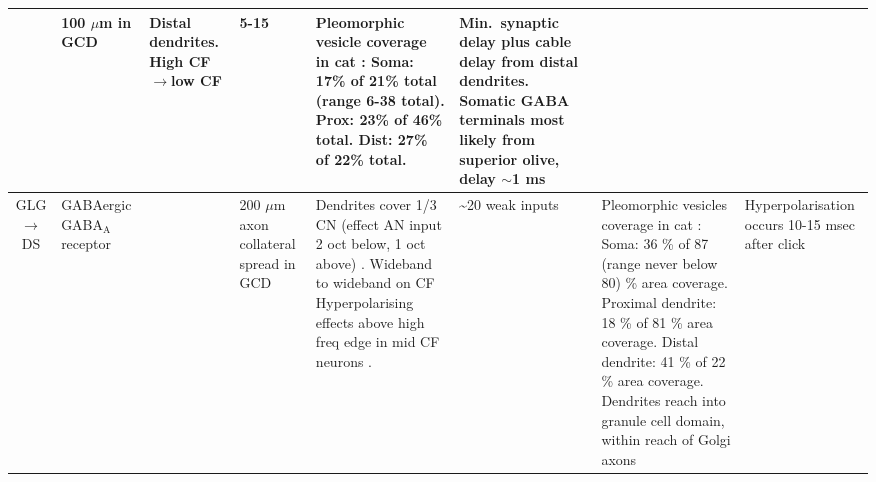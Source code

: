\begin{longtable}{cYYYYYYY}
& %
100 $\mu$m in GCD \citep{FerragamoGoldingEtAl:1998}
& %
Distal dendrites.
High CF\ensuremath{\rightarrow}low CF \citep[chinchilla][]{JosephsonMorest:1998}                        
& %
5-15 \citep[Estimate, cat][]{SmithRhode:1989}     
& %
Pleomorphic vesicle coverage in cat \citep{SmithRhode:1989}:
Soma: 17\% of 21\% total (range 6-38 total). 
Prox: 23\% of 46\% total. 
Dist: 27\% of 22\% total. 
& %
Min.\ synaptic delay plus cable delay from distal dendrites.
Somatic GABA terminals most likely from superior olive, delay $\sim$1 ms
\\ \midrule
GLG\ensuremath{\rightarrow}DS                         
& %
{GABAergic} {GABA$_{\textrm{A}}$} receptor \citep{EvansZhao:1998,FerragamoGoldingEtAl:1998a,Mugnaini:1985,MugnainiOsenEtAl:1980,SaintMorestEtAl:1989}                           
& %
& %
200 $\mu$m axon collateral spread in GCD \citep{FerragamoGoldingEtAl:1998}
& %
Dendrites cover 1/3 CN (effect AN input 2 oct below, 1 oct above) \citep[guinea pig][]{PalmerJiangEtAl:1996}.
Wideband to wideband on CF \citep{EvansZhao:1998} 
Hyperpolarising effects above high freq edge in mid CF neurons \citep[rat][]{PaoliniClark:1999}.                    
& %
\~{}20 weak inputs\citep{SaintMorestEtAl:1989}                     
& %
Pleomorphic vesicles coverage in cat \citep{SmithRhode:1989}:
Soma: 36 \%  of 87 (range never below 80) \% area coverage. 
Proximal dendrite: 18 \%  of 81 \% area coverage.  
Distal dendrite: 41 \%  of 22 \% area coverage.   
Dendrites reach into granule cell domain, within reach of Golgi axons \citep{OertelWuEtAl:1990,ArnottWallaceEtAl:2004}     
& %
Hyperpolarisation occurs 10-15 msec after click \citep{PaoliniClark:1999}
\\ \midrule
\end{longtable}





